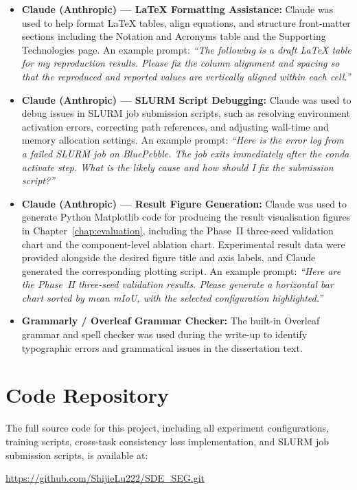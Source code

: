 \documentclass[
  oneside,
  author={Shijie Lu},
  degree={BSc},
  title={Label-Efficient Semantic Segmentation via Self-Supervised Depth Estimation and Cross-Task Consistency},
  unit={COMS30045},
  subtitle={}
]{dissertation}
\begin{document}
\begin{itemize}

    \item \textbf{Claude (Anthropic) --- \LaTeX{} Formatting Assistance:}
    Claude was used to help format \LaTeX{} tables, align equations, and
    structure front-matter sections including the Notation and Acronyms
    table and the Supporting Technologies page. An example prompt:
    \textit{``The following is a draft LaTeX table for my reproduction
    results. Please fix the column alignment and spacing so that the
    reproduced and reported values are vertically aligned within each
    cell.''}

    \item \textbf{Claude (Anthropic) --- SLURM Script Debugging:}
    Claude was used to debug issues in SLURM job submission scripts, such
    as resolving environment activation errors, correcting path references,
    and adjusting wall-time and memory allocation settings. An example
    prompt: \textit{``Here is the error log from a failed SLURM job on
    BluePebble. The job exits immediately after the conda activate step.
    What is the likely cause and how should I fix the submission
    script?''}

    \item \textbf{Claude (Anthropic) --- Result Figure Generation:}
    Claude was used to generate Python Matplotlib code for producing the
    result visualisation figures in Chapter~\ref{chap:evaluation},
    including the Phase~II three-seed validation chart and the
    component-level ablation chart. Experimental result data were
    provided alongside the desired figure title and axis labels, and
    Claude generated the corresponding plotting script. An example
    prompt: \textit{``Here are the Phase~II three-seed validation
    results. Please generate a horizontal bar chart sorted by mean
    mIoU, with the selected configuration highlighted.''}

    \item \textbf{Grammarly / Overleaf Grammar Checker:}
    The built-in Overleaf grammar and spell checker was used during
    the write-up to identify typographic errors and grammatical issues
    in the dissertation text.

\end{itemize}

\chapter{Code Repository}
\label{appx:code}

\noindent
The full source code for this project, including all experiment
configurations, training scripts, cross-task consistency loss
implementation, and SLURM job submission scripts, is available at:

\begin{center}
\url{https://github.com/ShijieLu222/SDE_SEG.git}
\end{center}

\end{document}

